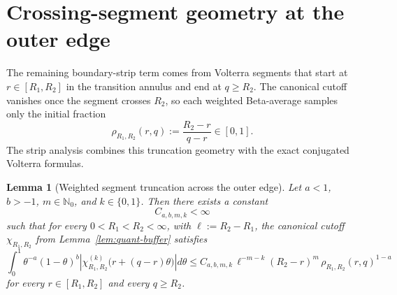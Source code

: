 \documentclass[11pt,a4paper]{amsart}
\theoremstyle{plain}
\newtheorem{lemma}[theorem]{Lemma}
\theoremstyle{definition}
\theoremstyle{remark}
\begin{document}
\section{Crossing-segment geometry at the outer edge}
\label{sec:edge-geometry}

The remaining boundary-strip term comes from Volterra segments that start at
\(r\in[R_1,R_2]\) in the transition annulus and end at \(q\ge R_2\).  The canonical cutoff vanishes
once the segment crosses \(R_2\), so each weighted Beta-average samples only the initial fraction
\[
\rho_{R_1,R_2}(r,q):=\frac{R_2-r}{q-r}\in[0,1].
\]
The strip analysis combines this truncation geometry with the exact conjugated Volterra formulas.

\begin{lemma}[Weighted segment truncation across the outer edge]
\label{lem:edge-segment}
Let \(a<1\), \(b>-1\), \(m\in\mathbb N_0\), and \(k\in\{0,1\}\). Then there exists a constant
\[
C_{a,b,m,k}<\infty
\]
such that for every \(0<R_1<R_2<\infty\), with \(\ell:=R_2-R_1\), the canonical cutoff
\(\chi_{R_1,R_2}\) from Lemma~\ref{lem:quant-buffer} satisfies
\begin{equation}\label{eq:edge-segment}
\int_0^1
\theta^{-a}(1-\theta)^b
\left|
\chi_{R_1,R_2}^{(k)}\!\bigl(r+(q-r)\theta\bigr)
\right|
d\theta
\le
C_{a,b,m,k}\,\ell^{-m-k}(R_2-r)^m\,
\rho_{R_1,R_2}(r,q)^{1-a}
\end{equation}
for every \(r\in[R_1,R_2]\) and every \(q\ge R_2\).
\end{lemma}
\end{document}
